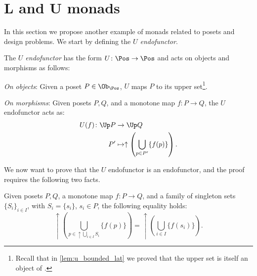 \section{L and U monads}
In this section we propose another example of monads related to posets and design problems. We start by defining the \emph{$U$ endofunctor}.
\begin{definition}[$U$ endofunctor]
    \label{def:ufunctor}
    The \emph{$U$ endofunctor} has the form $U\colon \Pos \to \Pos$ and acts on objects and morphisms as follows:
    \begin{compactenum}
        \item \emph{On objects}: Given a poset $P\in \Ob_\Pos$, $U$ maps $P$ to its upper set\footnote{Recall that in \cref{lem:u_bounded_lat} we proved that the upper set is itself an object of \Pos.}.
        \item \emph{On morphisms}: Given posets $P,Q$, and a monotone map $f\colon P\to Q$, the $U$ endofunctor acts as:
        \begin{equation}
            \begin{aligned}
                U(f)\colon \Up P&\to \Up Q\\
                P'&\mapsto \uparrow \left( \bigcup_{p\in P'} \{f(p)\}\right).
            \end{aligned}
        \end{equation}
    \end{compactenum}
\end{definition}
We now want to prove that the $U$ endofunctor is an endofunctor, and the proof requires the following two facts.
\begin{lemma}
    \label{lem:unpack_u_functor}
    Given posets $P,Q$, a monotone map $f\colon P \to Q$, and a family of singleton sets $\{S_i\}_{i\in I}$, with $S_i=\{s_i\}$, $s_i\in P$, the following equality holds:
    \begin{equation}
        \label{eq:lemma_unpack}
        \uparrow\left( \bigcup_{p\in \uparrow \bigcup_{i\in I}S_i}\{f(p)\}\right)= \uparrow \left( \bigcup_{i\in I} \{f(s_i)\}\right).
    \end{equation}
\end{lemma}
